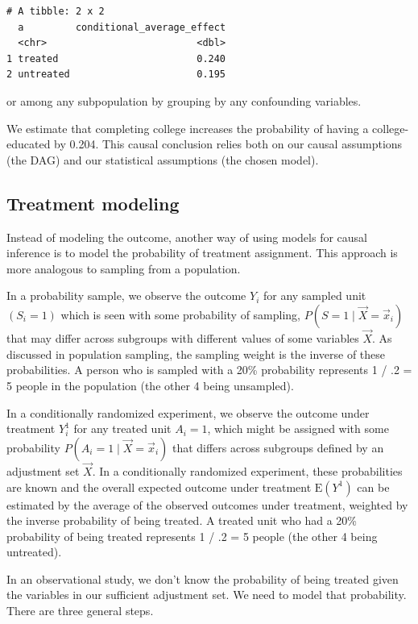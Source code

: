 \documentclass[
  letterpaper,
  DIV=11,
  numbers=noendperiod]{scrartcl}
\begin{document}
\begin{verbatim}
# A tibble: 2 x 2
  a         conditional_average_effect
  <chr>                          <dbl>
1 treated                        0.240
2 untreated                      0.195
\end{verbatim}

or among any subpopulation by grouping by any confounding variables.

We estimate that completing college increases the probability of having
a college-educated by 0.204. This causal conclusion relies both on our
causal assumptions (the DAG) and our statistical assumptions (the chosen
model).

\subsection{Treatment modeling}\label{treatment-modeling}

Instead of modeling the outcome, another way of using models for causal
inference is to model the probability of treatment assignment. This
approach is more analogous to sampling from a population.

In a probability sample, we observe the outcome \(Y_i\) for any sampled
unit \((S_i=1)\) which is seen with some probability of sampling,
\(P(S=1\mid\vec{X} = \vec{x}_i)\) that may differ across subgroups with
different values of some variables \(\vec{X}\). As discussed in
population sampling, the sampling weight is the inverse of these
probabilities. A person who is sampled with a 20\% probability
represents 1 / .2 = 5 people in the population (the other 4 being
unsampled).

In a conditionally randomized experiment, we observe the outcome under
treatment \(Y_i^1\) for any treated unit \(A_i=1\), which might be
assigned with some probability \(P(A_i=1\mid\vec{X} = \vec{x}_i)\) that
differs across subgroups defined by an adjustment set \(\vec{X}\). In a
conditionally randomized experiment, these probabilities are known and
the overall expected outcome under treatment \(\text{E}(Y^1)\) can be
estimated by the average of the observed outcomes under treatment,
weighted by the inverse probability of being treated. A treated unit who
had a 20\% probability of being treated represents 1 / .2 = 5 people
(the other 4 being untreated).

In an observational study, we don't know the probability of being
treated given the variables in our sufficient adjustment set. We need to
model that probability. There are three general steps.
\end{document}
